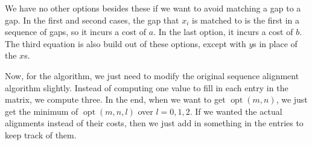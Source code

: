 \documentclass{article}
\DeclareMathOperator{\opt}{opt}
\begin{document}
We have no other options besides these if we want to avoid matching a gap to a gap. In the first and second cases, the gap that $x_i$ is matched to is the first in a sequence of gaps, so it incurs a cost of $a$. In the last option, it incurs a cost of $b$. The third equation is also build out of these options, except with $y$s in place of the $x$s. 

Now, for the algorithm, we just need to modify the original sequence alignment algorithm slightly. Instead of computing one value to fill in each entry in the matrix, we compute three. In the end, when we want to get $\opt(m,n)$, we just get the minimum of $\opt(m,n,l)$ over $l=0,1,2$. If we wanted the actual alignments instead of their costs, then we just add in something in the entries to keep track of them.
\end{document}
